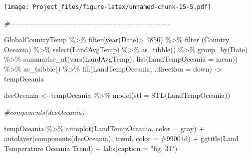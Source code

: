 \documentclass[
]{article}
\newenvironment{Shaded}{\begin{snugshade}}{\end{snugshade}}
\newcommand{\AttributeTok}[1]{\textcolor[rgb]{0.77,0.63,0.00}{#1}}
\newcommand{\CommentTok}[1]{\textcolor[rgb]{0.56,0.35,0.01}{\textit{#1}}}
\newcommand{\DecValTok}[1]{\textcolor[rgb]{0.00,0.00,0.81}{#1}}
\newcommand{\FunctionTok}[1]{\textcolor[rgb]{0.00,0.00,0.00}{#1}}
\newcommand{\NormalTok}[1]{#1}
\newcommand{\OtherTok}[1]{\textcolor[rgb]{0.56,0.35,0.01}{#1}}
\newcommand{\SpecialCharTok}[1]{\textcolor[rgb]{0.00,0.00,0.00}{#1}}
\newcommand{\StringTok}[1]{\textcolor[rgb]{0.31,0.60,0.02}{#1}}
\begin{document}
\texttt{[image: Project\_files/figure-latex/unnamed-chunk-15-5.pdf]}

\begin{Shaded}
\begin{Highlighting}[]
\CommentTok{\#{-}{-}{-}{-}{-}{-}{-}{-}{-}{-}{-}{-}{-}{-}{-}{-}{-}{-}{-}{-}{-}{-}{-}{-}{-}{-}{-}{-}{-}{-}{-}{-}{-}{-}{-}{-}{-}{-}{-}{-}{-}{-}{-}{-}{-}{-}{-}{-}{-}{-}{-}{-}{-}{-}{-}{-}{-}{-}{-}{-}{-}{-}{-}{-}}

\NormalTok{GlobalCountryTemp }\SpecialCharTok{\%\textgreater{}\%}
  \FunctionTok{filter}\NormalTok{(}\FunctionTok{year}\NormalTok{(Date)}\SpecialCharTok{\textgreater{}} \DecValTok{1850}\NormalTok{) }\SpecialCharTok{\%\textgreater{}\%}
  \FunctionTok{filter}\NormalTok{ (Country }\SpecialCharTok{==} \StringTok{\textquotesingle{}Oceania\textquotesingle{}}\NormalTok{) }\SpecialCharTok{\%\textgreater{}\%}
  \FunctionTok{select}\NormalTok{(LandAvgTemp) }\SpecialCharTok{\%\textgreater{}\%}
  \FunctionTok{as\_tibble}\NormalTok{() }\SpecialCharTok{\%\textgreater{}\%}
  \FunctionTok{group\_by}\NormalTok{(Date) }\SpecialCharTok{\%\textgreater{}\%} 
  \FunctionTok{summarise\_at}\NormalTok{(}\FunctionTok{vars}\NormalTok{(LandAvgTemp), }\FunctionTok{list}\NormalTok{(}\AttributeTok{LandTempOceania =}\NormalTok{ mean)) }\SpecialCharTok{\%\textgreater{}\%}
  \FunctionTok{as\_tsibble}\NormalTok{() }\SpecialCharTok{\%\textgreater{}\%}
  \FunctionTok{fill}\NormalTok{(LandTempOceania, }\AttributeTok{.direction =} \StringTok{\textquotesingle{}down\textquotesingle{}}\NormalTok{) }\OtherTok{{-}\textgreater{}}\NormalTok{ tempOceania}

\NormalTok{decOceania }\OtherTok{\textless{}{-}}\NormalTok{ tempOceania }\SpecialCharTok{\%\textgreater{}\%} 
  \FunctionTok{model}\NormalTok{(}\AttributeTok{stl =} \FunctionTok{STL}\NormalTok{(LandTempOceania))}

\CommentTok{\#components(decOceania)}

\NormalTok{tempOceania }\SpecialCharTok{\%\textgreater{}\%}
  \FunctionTok{autoplot}\NormalTok{(LandTempOceania, }\AttributeTok{color =} \StringTok{\textquotesingle{}gray\textquotesingle{}}\NormalTok{) }\SpecialCharTok{+} 
  \FunctionTok{autolayer}\NormalTok{(}\FunctionTok{components}\NormalTok{(decOceania), trend, }\AttributeTok{color =} \StringTok{\textquotesingle{}\#99004d\textquotesingle{}}\NormalTok{) }\SpecialCharTok{+} 
  \FunctionTok{ggtitle}\NormalTok{(}\StringTok{\textquotesingle{}Land Temperature Oceania Trend\textquotesingle{}}\NormalTok{) }\SpecialCharTok{+}
  \FunctionTok{labs}\NormalTok{(}\AttributeTok{caption =} \StringTok{"fig. 31"}\NormalTok{)}
\end{Highlighting}
\end{Shaded}
\end{document}

